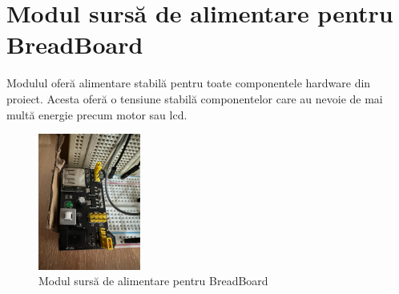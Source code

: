 \documentclass{report}
\begin{document}
\section{Modul sursă de alimentare pentru BreadBoard}
Modulul oferă alimentare stabilă pentru toate componentele hardware din proiect. Acesta oferă o tensiune stabilă componentelor care au nevoie de mai multă energie precum motor sau lcd. 

\begin{figure}[H]
    \centering
    \includegraphics[width=0.3\textwidth]{power_supply.jpg}
    \caption{Modul sursă de alimentare pentru BreadBoard}
    \label{fig:power_supply}
\end{figure}
\newpage
\vspace*{1cm}
\end{document}
